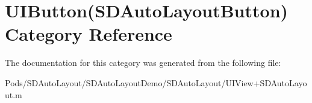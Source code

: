 \hypertarget{category_u_i_button_07_s_d_auto_layout_button_08}{}\section{U\+I\+Button(S\+D\+Auto\+Layout\+Button) Category Reference}
\label{category_u_i_button_07_s_d_auto_layout_button_08}


The documentation for this category was generated from the following file\+:\begin{DoxyCompactItemize}
\item 
Pods/\+S\+D\+Auto\+Layout/\+S\+D\+Auto\+Layout\+Demo/\+S\+D\+Auto\+Layout/U\+I\+View+\+S\+D\+Auto\+Layout.\+m\end{DoxyCompactItemize}
